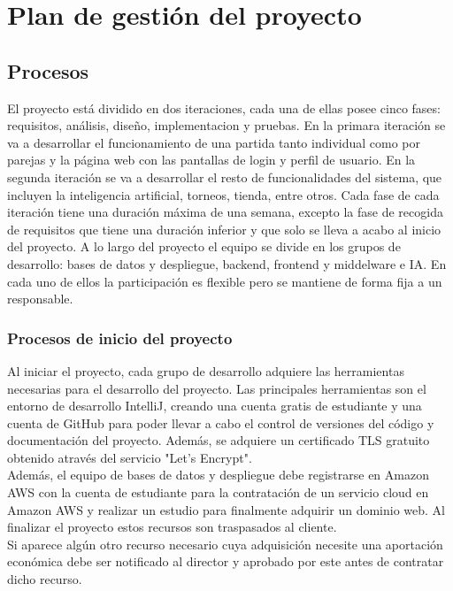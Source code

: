 \section{Plan de gestión del proyecto}
\label{planes}
\subsection{Procesos}
\label{procesos}

El proyecto está dividido en dos iteraciones, cada una de ellas posee cinco fases: requisitos, análisis, diseño, implementacion y pruebas. En la primara iteración se va a desarrollar el funcionamiento de una partida tanto individual como por parejas y la página web con las pantallas de login y perfil de usuario. En la segunda iteración se va a desarrollar el resto de funcionalidades del sistema, que incluyen la inteligencia artificial, torneos, tienda, entre otros.  Cada fase de cada iteración tiene una duración máxima de una semana, excepto la fase de recogida de requisitos que tiene una duración inferior y que solo se lleva a acabo al inicio del proyecto.
A lo largo del proyecto el equipo se divide en los grupos de desarrollo: bases de datos y despliegue, backend, frontend y middelware e IA. En cada uno de ellos la participación es flexible pero se mantiene de forma fija a un responsable.

\subsubsection{Procesos de inicio del proyecto}
\label{inicio}

Al iniciar el proyecto, cada grupo de desarrollo adquiere las herramientas necesarias para el desarrollo del proyecto. Las principales herramientas son el entorno de desarrollo IntelliJ, creando una cuenta gratis de estudiante y una cuenta de GitHub para poder llevar a cabo el control de versiones del código y documentación del proyecto. Además, se adquiere un certificado TLS gratuito obtenido através del servicio "Let's Encrypt". \\

Además, el equipo  de bases de datos y despliegue debe registrarse en Amazon AWS con la cuenta de estudiante para la contratación de un servicio cloud en Amazon AWS y realizar un estudio para finalmente adquirir un dominio web.  Al finalizar el proyecto estos recursos son traspasados al cliente. \\

Si aparece algún otro recurso necesario cuya adquisición necesite una aportación económica debe ser notificado al director y aprobado por este antes de contratar dicho recurso.\\

